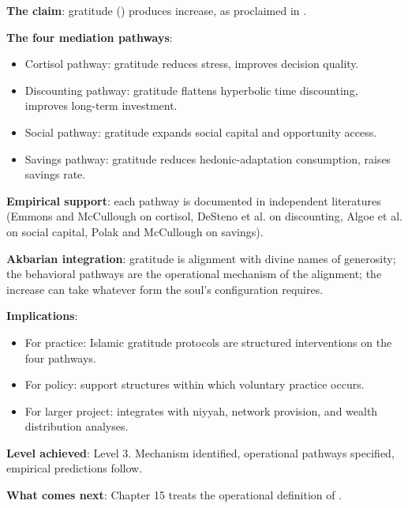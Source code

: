 \begin{summarybox}
\textbf{The claim}: gratitude () produces increase, as
proclaimed in .

\textbf{The four mediation pathways}:
\begin{itemize}[leftmargin=1.5em]
    \item Cortisol pathway: gratitude reduces stress, improves
    decision quality.
    \item Discounting pathway: gratitude flattens hyperbolic time
    discounting, improves long-term investment.
    \item Social pathway: gratitude expands social capital and
    opportunity access.
    \item Savings pathway: gratitude reduces hedonic-adaptation
    consumption, raises savings rate.
\end{itemize}

\textbf{Empirical support}: each pathway is documented in
independent literatures (Emmons and McCullough on cortisol,
DeSteno et al. on discounting, Algoe et al. on social capital,
Polak and McCullough on savings).

\textbf{Akbarian integration}: gratitude is alignment with divine
names of generosity; the behavioral pathways are the operational
mechanism of the alignment; the increase can take whatever form
the soul's configuration requires.

\textbf{Implications}:
\begin{itemize}[leftmargin=1.5em]
    \item For practice: Islamic gratitude protocols are structured
    interventions on the four pathways.
    \item For policy: support structures within which voluntary
    practice occurs.
    \item For larger project: integrates with niyyah, network
    provision, and wealth distribution analyses.
\end{itemize}

\textbf{Level achieved}: Level 3. Mechanism identified, operational
pathways specified, empirical predictions follow.

\textbf{What comes next}: Chapter 15 treats the operational
definition of .
\end{summarybox}

\cleardoublepage
